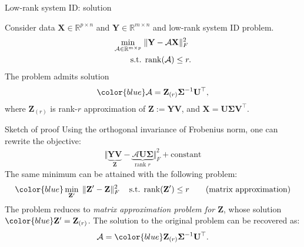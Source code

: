 \documentclass[10pt]{beamer}
\newcommand{\blue}{\color{blue}}
\newcommand{\bX}{\mathbf{X}}
\newcommand{\bY}{\mathbf{Y}}
\newcommand{\bZ}{\mathbf{Z}}
\newcommand{\bS}{\mathbf{\Sigma}}
\newcommand{\bU}{\mathbf{U}}
\newcommand{\bV}{\mathbf{V}}
\newcommand{\rank}{\mathop{\textrm{\textup{rank}}}}
\newcommand{\st}{\mathop{\textrm{\textup{s.t.}}}}
\begin{document}
\begin{frame}{Low-rank system ID: solution}
  \begin{theorem}
    Consider data $\bX\in\mathbb{R}^{p\times n}$ and $\bY\in\mathbb{R}^{m\times n}$ and {\blue low-rank system ID problem}.
    \begin{align*}
      \min_{\mathcal{A}\in\mathbb{R}^{m\times p}}\;& \Vert \bY - \mathcal{A} \bX \Vert_F^2\\
      \st\;&\rank(\mathcal{A})\leq r.
    \end{align*}
    The problem admits solution
    \begin{align*}
      \blue\mathcal{A} = \bZ_{(r)} \bS^{-1}\bU^\top,
    \end{align*}
    where $\bZ_{(r)}$ is rank-$r$ approximation of $\bZ:= \bY\bV$, and $\bX=\bU\bS\bV^\top$.
  \end{theorem}
\end{frame}

\begin{frame}
  \begin{block}{Sketch of proof}\small
  Using the orthogonal invariance of Frobenius norm, one can rewrite the objective:
  \begin{align*}
    \Vert \underbrace{\bY \bV}_{\bZ} - \underbrace{\mathcal{A} \bU\bS}_{\text{rank $r$}} \Vert^2_F +\text{constant}
  \end{align*}
  The same minimum can be attained with the following problem:
  \begin{align}\label{eqn:equiv}\blue
    \min_{\bZ'}\;\Vert\bZ' - \bZ\Vert^2_F \quad\st\;{\rank(\bZ')\leq r} \tag{matrix approximation}
  \end{align}
  The problem reduces to {\blue\em matrix approximation problem for $\bZ$}, whose solution $\blue \bZ'=\bZ_{(r)}$. The solution to the original problem can be recovered as:
  \begin{align*}
    \mathcal{A} = {\blue \bZ_{(r)}} \bS^{-1}\bU^\top.
  \end{align*}
  \end{block}
\end{frame}
\end{document}
